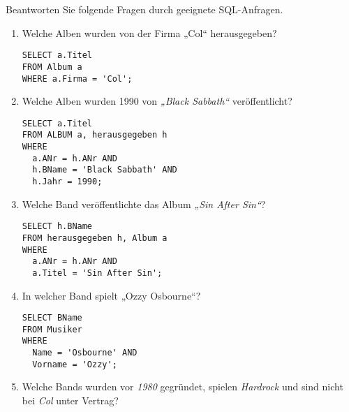 \documentclass{bschlangaul-aufgabe}
\begin{document}
\noindent
Beantworten Sie folgende Fragen durch geeignete SQL-Anfragen.

\begin{enumerate}


\item Welche Alben wurden von der Firma „Col“ herausgegeben?

\begin{liAntwort}
\begin{verbatim}
SELECT a.Titel
FROM Album a
WHERE a.Firma = 'Col';
\end{verbatim}
\end{liAntwort}


\item Welche Alben wurden 1990 von \emph{„Black Sabbath“}
veröffentlicht?

\begin{liAntwort}
\begin{verbatim}
SELECT a.Titel
FROM ALBUM a, herausgegeben h
WHERE
  a.ANr = h.ANr AND
  h.BName = 'Black Sabbath' AND
  h.Jahr = 1990;
\end{verbatim}
\end{liAntwort}


\item Welche Band veröffentlichte das Album \emph{„Sin After Sin“}?

\begin{liAntwort}
\begin{verbatim}
SELECT h.BName
FROM herausgegeben h, Album a
WHERE
  a.ANr = h.ANr AND
  a.Titel = 'Sin After Sin';
\end{verbatim}
\end{liAntwort}


\item In welcher Band spielt „Ozzy Osbourne“?

\begin{liAntwort}
\begin{verbatim}
SELECT BName
FROM Musiker
WHERE
  Name = 'Osbourne' AND
  Vorname = 'Ozzy';
\end{verbatim}
\end{liAntwort}


\item Welche Bands wurden vor \emph{1980} gegründet, spielen
\emph{Hardrock} und sind nicht bei \emph{Col} unter Vertrag?


\end{enumerate}
\end{document}
